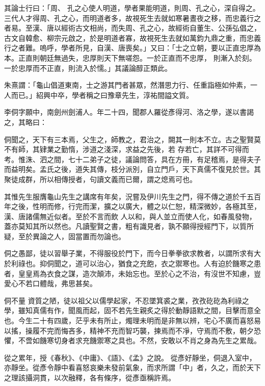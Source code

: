 \begin{pinyinscope}
 其論士行曰：「周、
 孔之心使人明道，學者果能明道，則周、孔之心，深自得之。三代人才得周、孔之心，而明道者多，故視死生去就如寒暑晝夜之移，而忠義行之者易。至漢、唐以經術古文相尚，而失周、孔之心，故經術自董生、公孫弘倡之，古文自韓愈、柳宗元啟之，於是明道者寡，故視死生去就如萬鈞九鼎之重，而忠義行之者難。嗚呼，學者所見，自漢、唐喪矣。」又曰：「士之立朝，要以正直忠厚為本。正直則朝廷無過失，忠厚則天下無嗟怨。一於正直而不忠厚，
 則漸入於刻。一於忠厚而不正直，則流入於懦。」其議論醇正類此。



 朱熹謂：「龜山倡道東南，士之游其門者甚眾，然潛思力行、任重詣極如仲素，一人而已。」紹興中卒，學者稱之曰豫章先生，淳祐間謚文質。



 李侗字願中，南劍州劍浦人。年二十四，聞郡人羅從彥得河、洛之學，遂以書謁之，其略曰：



 侗聞之，天下有三本焉，父生之，師教之，君治之，闕其一則本不立。古之聖賢莫不有師，其肄業之勤惰，涉道之淺深，求益之先後，若
 存若亡，其詳不可得而考。惟洙、泗之間，七十二弟子之徒，議論問答，具在方冊，有足稽焉，是得夫子而益明矣。孟氏之後，道失其傳，枝分派別，自立門戶，天下真儒不復見於世。其聚徒成群，所以相傳授者，句讀文義而已爾，謂之熄焉可也。



 其惟先生服膺龜山先生之講席有年矣，況嘗及伊川先生之門，得不傳之道於千五百年之後，性明而修，行完而潔，擴之以廣大，體之以仁恕，精深微妙，各極其至，漢、唐諸儒無近似者。至於不言而飲
 人以和，與人並立而使人化，如春風發物，蓋亦莫知其所以然也。凡讀聖賢之書，粗有識見者，孰不願得授經門下，以質所疑，至於異論之人，固當置而勿論也。



 侗之愚鄙，徒以習舉子業，不得服役於門下，而今日拳拳欲求教者，以謂所求有大於利祿也。抑侗聞之，道可以治心，猶食之充飽，衣之禦寒也。人有迫於饑寒之患者，皇皇焉為衣食之謀，造次顛沛，未始忘也。至於心之不治，有沒世不知慮，豈愛心不若口體哉，弗思甚矣。



 侗不量
 資質之陋，徒以祖父以儒學起家，不忍墜箕裘之業，孜孜矻矻為利祿之學，雖知真儒有作，聞風而起，固不若先生親炙之得於動靜語默之間，目擊而意全也。今生二十有四歲，茫乎未有所止，燭理未明而是非無以辨，宅心不廣而喜怒易以搖，操履不完而悔吝多，精神不充而智巧襲，揀焉而不凈，守焉而不敷，朝夕恐懼，不啻如饑寒切身者求充饑禦寒之具也。不然，安敢以不肖之身為先生之累哉。



 從之累年，授《春秋》、《中庸》、《語》、《孟》之說。
 從彥好靜坐，侗退入室中，亦靜坐。從彥令靜中看喜怒哀樂未發前氣象，而求所謂「中」者，久之，而於天下之理該攝洞貫，以次融釋，各有條序，從彥亟稱許焉。




\end{pinyinscope}
